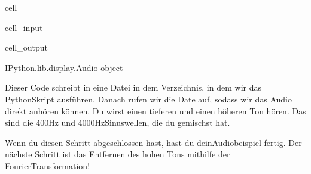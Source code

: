 \documentclass[letterpaper,10pt,english]{jupyterBook}
\begin{document}
\begin{sphinxuseclass}{cell}\begin{sphinxVerbatimInput}

\begin{sphinxuseclass}{cell_input}
\begin{sphinxVerbatim}[commandchars=\\\{\}]
   
   
  
 
\end{sphinxVerbatim}

\end{sphinxuseclass}\end{sphinxVerbatimInput}
\begin{sphinxVerbatimOutput}

\begin{sphinxuseclass}{cell_output}
\begin{sphinxVerbatim}[commandchars=\\\{\}]
\PYGZlt{}IPython.lib.display.Audio object\PYGZgt{}
\end{sphinxVerbatim}

\end{sphinxuseclass}\end{sphinxVerbatimOutput}

\end{sphinxuseclass}
\sphinxAtStartPar
Dieser Code schreibt in eine Datei  in dem Verzeichnis, in dem wir das Python\sphinxhyphen{}Skript ausführen. Danach rufen wir die Date auf, sodass wir das Audio direkt anhören können. Du wirst einen tieferen und einen höheren Ton hören. Das sind die 400\sphinxhyphen{}Hz\sphinxhyphen{} und 4000\sphinxhyphen{}Hz\sphinxhyphen{}Sinuswellen, die du gemischst hat.

\sphinxAtStartPar
Wenn du diesen Schritt abgeschlossen hast, hast du deinAudiobeispiel fertig. Der nächste Schritt ist das Entfernen des hohen Tons mithilfe der Fourier\sphinxhyphen{}Transformation!
\end{document}

